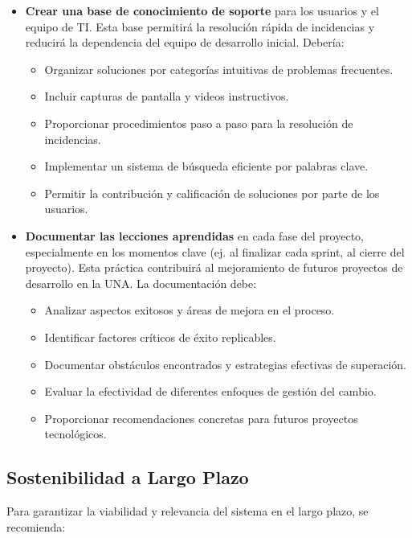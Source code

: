 \begin{itemize}
    \item \textbf{Crear una base de conocimiento de soporte} para los usuarios y
        el equipo de TI. Esta base permitirá la resolución rápida de incidencias
        y reducirá la dependencia del equipo de desarrollo inicial. Debería:
        \begin{itemize}
            \item Organizar soluciones por categorías intuitivas de problemas frecuentes.
            \item Incluir capturas de pantalla y videos instructivos.
            \item Proporcionar procedimientos paso a paso para la resolución de incidencias.
            \item Implementar un sistema de búsqueda eficiente por palabras clave.
            \item Permitir la contribución y calificación de soluciones por parte de los usuarios.
        \end{itemize}

    \item \textbf{Documentar las lecciones aprendidas} en cada fase del proyecto,
        especialmente en los momentos clave (ej. al finalizar cada sprint, al cierre
        del proyecto). Esta práctica contribuirá al mejoramiento de futuros proyectos
        de desarrollo en la UNA. La documentación debe:
        \begin{itemize}
            \item Analizar aspectos exitosos y áreas de mejora en el proceso.
            \item Identificar factores críticos de éxito replicables.
            \item Documentar obstáculos encontrados y estrategias efectivas de superación.
            \item Evaluar la efectividad de diferentes enfoques de gestión del cambio.
            \item Proporcionar recomendaciones concretas para futuros proyectos tecnológicos.
        \end{itemize}
\end{itemize}

\subsection{Sostenibilidad a Largo Plazo}
Para garantizar la viabilidad y relevancia del sistema en el largo plazo, se
recomienda:

